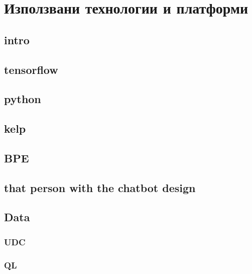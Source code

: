 \chapter{Използвани технологии и платформи}

\label{Chapter3}


\section{intro}

\section{tensorflow}
\section{python}
\section{kelp}
\section{BPE}
\section{that person with the chatbot design}
\section{Data}
\subsection{UDC}
\subsection{QL}

